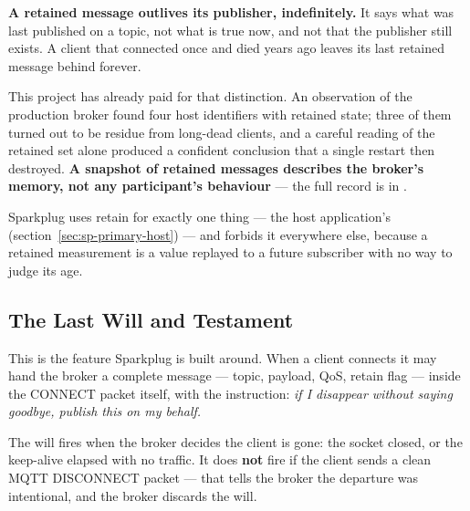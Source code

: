 \begin{warning}
\textbf{A retained message outlives its publisher, indefinitely.} It says what was last
published on a topic, not what is true now, and not that the publisher still exists. A
client that connected once and died years ago leaves its last retained message behind
forever.

This project has already paid for that distinction. An observation of the production
broker found four host identifiers with retained state; three of them turned out to be
residue from long-dead clients, and a careful reading of the retained set alone produced a
confident conclusion that a single restart then destroyed. \textbf{A snapshot of retained
messages describes the broker's memory, not any participant's behaviour} --- the full
record is in .
\end{warning}

Sparkplug uses retain for exactly one thing --- the host application's 
(section~\ref{sec:sp-primary-host}) --- and forbids it everywhere else, because a retained
measurement is a value replayed to a future subscriber with no way to judge its age.

\subsection{The Last Will and Testament}

This is the feature Sparkplug is built around. When a client connects it may hand the
broker a complete message --- topic, payload, QoS, retain flag --- inside the CONNECT
packet itself, with the instruction: \emph{if I disappear without saying goodbye, publish
this on my behalf.}

The will fires when the broker decides the client is gone: the socket closed, or the
keep-alive elapsed with no traffic. It does \textbf{not} fire if the client sends a clean
MQTT DISCONNECT packet --- that tells the broker the departure was intentional, and the
broker discards the will.

\begin{center}
\end{center}

